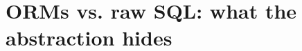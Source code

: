 \chapter{ORMs vs. raw SQL: what the abstraction hides}
\label{ch:orms-vs-raw-sql-what-the-abstraction}

